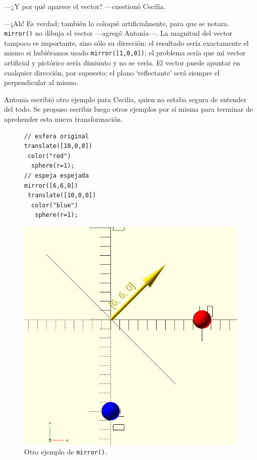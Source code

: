    ---¿Y por qué aparece el vector? ---cuestionó Cecilia.

   ---¡Ah! Es verdad; también lo coloqué artificialmente, para que se
   notara. \lstinline!mirror()! no dibuja el vector ---agregó
   Antonia---. La magnitud del vector tampoco es importante, sino sólo
   su dirección: el resultado sería exactamente el mismo si
   hubiéramos usado \lstinline!mirror([1,0,0])!; el problema sería que
   mi vector artificial y pictórico sería diminuto y no se vería. El
   vector puede apuntar en cualquier dirección, por supuesto; el plano
   `reflectante' será siempre el perpendicular al mismo.

   Antonia escribió otro ejemplo para Cecilia, quien no estaba segura
   de entender del todo. Se propuso escribir luego otros ejemplos por
   sí misma para terminar de aprehender esta nueva transformación.

   \begin{figure}[ht]
\begin{minipage}[]{.49\textwidth}     
   \begin{lstlisting}
// esfera original     
translate([10,0,0])
 color("red")
  sphere(r=1);
// espeja espejada 
mirror([6,6,0])
 translate([10,0,0])
  color("blue")
   sphere(r=1);
   \end{lstlisting}
 \end{minipage}
 \begin{minipage}[]{.5\textwidth}
   \centering
   \includegraphics[width=1\textwidth]{imagenes/mirror-2}
 \end{minipage}
 \caption{Otro ejemplo de \lstinline!mirror()!.}
     \label{fig:mirror-2}
   \end{figure}

